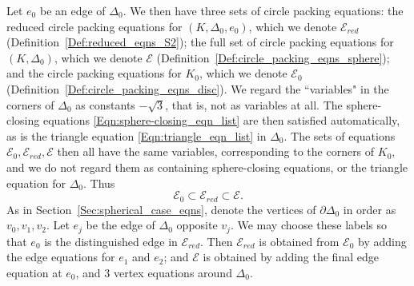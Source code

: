 \documentclass[12pt]{amsart}
\numberwithin{equation}{section}
\theoremstyle{named}
\newcommand{\refsec}[1]{Section~\ref{Sec:#1}}
\newcommand{\refdef}[1]{Definition~\ref{Def:#1}}
\newcommand{\refeqn}[1]{\eqref{Eqn:#1}}
\begin{document}
Let $e_0$ be an edge of $\Delta_0$. We then have three sets of circle packing equations: the reduced circle packing equations for $(K, \Delta_0, e_0)$, which we denote $\mathcal{E}_{red}$ (\refdef{reduced_eqns_S2}); the full set of circle packing equations for $(K, \Delta_0)$, which we denote $\mathcal{E}$ (\refdef{circle_packing_eqns_sphere}); and the circle packing equations for $K_0$, which we denote $\mathcal{E}_0$ (\refdef{circle_packing_eqns_disc}). We regard the ``variables" in the corners of $\Delta_0$ as constants $-\sqrt{3}$, that is, not as variables at all. The sphere-closing equations \refeqn{sphere-closing_eqn_list} are then satisfied automatically, as is the triangle equation \refeqn{triangle_eqn_list} in $\Delta_0$. The sets of equations $\mathcal{E}_0, \mathcal{E}_{red}, \mathcal{E}$ then all have the same variables, corresponding to the corners of $K_0$, and we do not regard them as containing sphere-closing equations, or the triangle equation for $\Delta_0$. Thus 
\[
\mathcal{E}_0 \subset \mathcal{E}_{red} \subset \mathcal{E}.
\]
As in \refsec{spherical_case_eqns}, denote the vertices of $\partial \Delta_0$ in order as $v_0, v_1, v_2$. Let $e_j$ be the edge of $\Delta_0$ opposite $v_j$. We may choose these labels so that $e_0$ is the distinguished edge in $\mathcal{E}_{red}$. Then $\mathcal{E}_{red}$ is obtained from $\mathcal{E}_0$ by adding the edge equations for $e_1$ and $e_2$; and $\mathcal{E}$ is obtained by adding the final edge equation at $e_0$, and $3$ vertex equations around $\Delta_0$.
\end{document}
